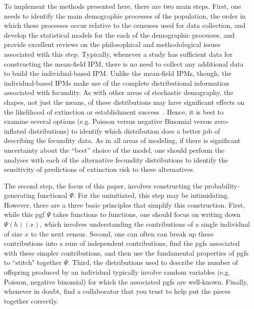 \documentclass[12pt]{amsart}\usepackage[]{graphicx}\usepackage[]{color}
\begin{document}
To implement the methods presented here, there are two main steps. First, one needs to identify the main demographic processes of the population, the order in which these processes occur relative to the censuses used for data collection, and develop the statistical models for the each of the demographic processes. \citet{rees-etal-14} and \citet{merow-etal-14} provide excellent reviews on the philosophical and methodological issues associated with this step. Typically, whenever a study has sufficient data for constructing the mean-field IPM, there is no need to collect any additional data to build the individual-based IPM.  Unlike the mean-field IPMs, though, the individual-based IPMs make use of the complete distributional information associated with fecundity. As with other areas of stochastic demography, the shapes, not just the means, of these distributions may have significant effects on the likelihood of extinction or establishment success~\citep{nature-05}. Hence, it is best to examine several options (e.g. Poisson versus negative Binomial versus zero-inflated distributions) to identify which distribution does a better job of describing the fecundity data. As in all areas of modeling, if there is significant uncertainty about the ``best'' choice of the model, one should perform the analyses with each of the alternative fecundity distributions to identify the sensitivity of predictions of extinction risk to these alternatives.

The second step, the focus of this paper, involves constructing the probability-generating functional $\Psi$. For the uninitiated, this step may be intimidating. However, there are a three basic principles that simplify this construction. First, while this pgf $\Psi$ takes functions to functions, one should focus on writing down $\Psi(h)(x)$, which involves understanding the contributions of a single individual of size $x$ to the next census. Second, one can often can break up these contributions into a sum of independent contributions, find the pgfs associated with these simpler contributions, and then use the fundamental properties of pgfs to ``stitch" together $\Psi$. Third, the distributions used to describe the number of offspring produced by an individual typically involve random variables (e.g. Poisson, negative binomial) for which the associated pgfs are well-known. Finally, whenever in doubt, find a collaborator that you trust to help put the pieces together correctly.
\end{document}
